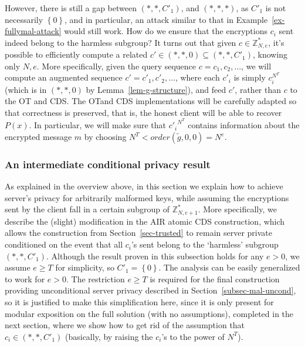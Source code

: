 \documentclass{article}
\newcommand{\set}[1]{\left\{#1\right\}}
\newcommand{\ot}{\mbox{OT}\;}
\newcommand{\U}[1]{\mathbb{Z}_{#1}^*}
\begin{document}
However, there is still a gap between
$(*,*,C'_1)$, and $(*,*,*)$, as $C'_1$ is not necessarily $\set{0}$, and
in particular, an attack similar to that in Example~\ref{ex-fullymal-attack} would still work.
How do we ensure that the encryptions $c_i$ sent indeed belong to the harmless
subgroup? %
It turns out that given $c\in \U{N,e}$, it's possible to efficiently compute a
related $c'\in (*,*,0)\subseteq(*,*,C'_1)$, knowing only $N,e$. More
specifically, given the query sequence $c=c_1,c_2,\ldots$, we will
compute an augmented sequence $c'=c'_1,c'_2,\ldots$, where each
$c'_i$ is simply $c^{N^T}_i$ (which is in $(*,*,0)$ by
Lemma~\ref{lem-g-structure}), and feed $c'$, rather than $c$ to the \ot
and CDS. The \ot and CDS implementations will be carefully adapted so
that correctness is preserved, that is, the honest client will be
able to recover $P(x)$. In particular, we will make sure that ${c'_i}^{N^T}$ contains information about the encrypted message $m$ by choosing $N^T<order(\tilde{g},0,0)=N^e$.
\subsubsection{An intermediate conditional privacy result}
\label{subsec-mal-cond}
As explained in the overview above, in this section we explain how to achieve server's privacy for arbitrarily malformed keys, while assuming
the encryptions sent by the client fall in a certain subgroup of $\U{N,e+1}$. 
More specifically, we describe the (slight) modification in the AIR atomic CDS construction, which allows the
construction from Section~\ref{sec-trusted} to remain server private conditioned on the event that all $c_i$'s sent belong to the `harmless' subgroup $(*,*,C'_1)$.
Although the result proven in this subsection holds for
any $e>0$, we assume $e\geq T$ for simplicity, so $C'_1=\set{0}$. The analysis can be easily generalized
to work for $e>0$. The restriction $e\geq T$ is required for the final construction providing unconditional server privacy described in Section~\ref{subsec-mal-uncond},
so it is justified to make this simplification here, since it is only present for modular exposition on the full solution (with no assumptions), completed
in the next section, where we show how to get rid of the assumption that $c_i\in (*,*,C'_1)$ (basically, by raising the $c_i$'s to the power of $N^T$).
\end{document}
